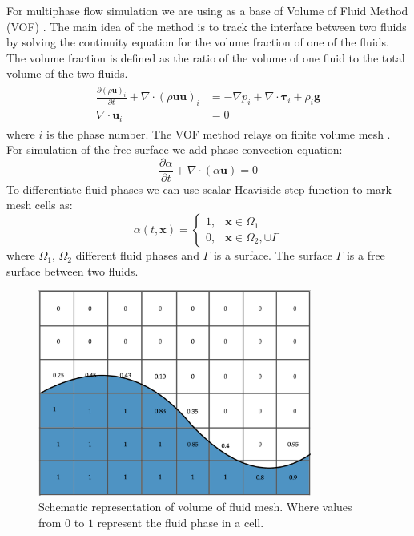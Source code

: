 For multiphase flow simulation we are using as a base of Volume of Fluid Method (VOF) \cite{hirt1981vof}. The main idea of the method is to track the interface between two fluids by solving the continuity equation for the volume fraction of one of the fluids. The volume fraction is defined as the ratio of the volume of one fluid to the total volume of the two fluids.
\begin{equation}
\begin{array}{c}
\begin{aligned}
\frac{\partial(\rho \mathbf{u})_{i}}{\partial t}+\nabla \cdot(\rho \mathbf{u u})_{i} & = -\nabla p_{i}+\nabla \cdot \boldsymbol{\tau}_{i}+\rho_{i} \mathbf{g} \\
\nabla \cdot \mathbf{u}_{i} &= 0
\end{aligned}
\end{array}
\end{equation}
where $i$ is the phase number. The VOF method relays on finite volume mesh \cite{ferziger2002cfd}. For simulation of the free surface we add phase convection equation:
\begin{equation}
\frac{\partial \alpha}{\partial t}+\nabla \cdot(\alpha \boldsymbol{u})=0
\end{equation}
To differentiate fluid phases we can use scalar Heaviside step function to mark mesh cells as:
\begin{equation}\label{2.1}
\alpha(t, \mathbf{x})=\left\{\begin{array}{ll}
1, & \mathbf{x} \in \Omega_{1} \\
0, & \mathbf{x} \in \Omega_{2}, \cup \Gamma
\end{array}\right.
\end{equation}
where $\Omega_{1}$, $\Omega_{2}$ different fluid phases and $\Gamma$ is a surface. The surface $\Gamma$ is a free surface between two fluids.
\begin{figure}[!ht]
    \centering
    \includegraphics[width=9cm]{Images/VOF_free_surface.png}
    \caption{Schematic representation of volume of fluid mesh. Where values from $0$ to $1$ represent the fluid phase in a cell.}
    \label{fig:galaxy}
\end{figure}
